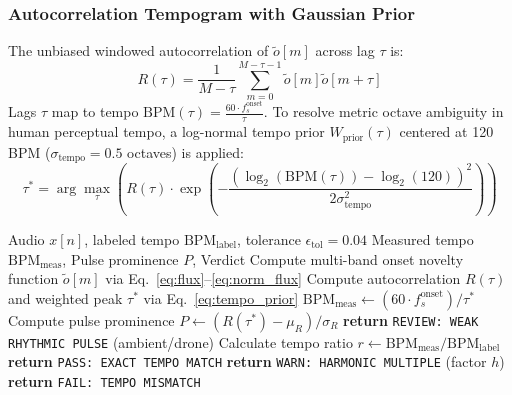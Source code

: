 \documentclass[10pt,journal,compsoc]{IEEEtran}
\begin{document}
\subsubsection{Autocorrelation Tempogram with Gaussian Prior}
The unbiased windowed autocorrelation of $\tilde{o}[m]$ across lag $\tau$ is:
\begin{equation}
R(\tau) = \frac{1}{M - \tau} \sum_{m=0}^{M - \tau - 1} \tilde{o}[m] \tilde{o}[m + \tau]
\label{eq:autocorr}
\end{equation}
Lags $\tau$ map to tempo $\text{BPM}(\tau) = \frac{60 \cdot f_s^{\text{onset}}}{\tau}$. To resolve metric octave ambiguity in human perceptual tempo, a log-normal tempo prior $W_{\text{prior}}(\tau)$ centered at 120\,BPM ($\sigma_{\text{tempo}} = 0.5$ octaves) is applied:
\begin{equation}
\tau^* = \arg\max_\tau \left( R(\tau) \cdot \exp\left( - \frac{(\log_2(\text{BPM}(\tau)) - \log_2(120))^2}{2 \sigma_{\text{tempo}}^2} \right) \right)
\label{eq:tempo_prior}
\end{equation}

\begin{algorithm}[t]
\caption{\texttt{tempocheck}: BPM Verification with Harmonic Tolerance}
\label{alg:tempocheck}
\begin{algorithmic}[1]
\REQUIRE Audio $x[n]$, labeled tempo $\text{BPM}_{\text{label}}$, tolerance $\epsilon_{\text{tol}} = 0.04$
\ENSURE Measured tempo $\text{BPM}_{\text{meas}}$, Pulse prominence $P$, Verdict
\STATE Compute multi-band onset novelty function $\tilde{o}[m]$ via Eq.~\eqref{eq:flux}--\eqref{eq:norm_flux}
\STATE Compute autocorrelation $R(\tau)$ and weighted peak $\tau^*$ via Eq.~\eqref{eq:tempo_prior}
\STATE $\text{BPM}_{\text{meas}} \leftarrow (60 \cdot f_s^{\text{onset}}) / \tau^*$
\STATE Compute pulse prominence $P \leftarrow (R(\tau^*) - \mu_R) / \sigma_R$
    \STATE \textbf{return} \texttt{REVIEW: WEAK RHYTHMIC PULSE} (ambient/drone)
\ENDIF
\STATE Calculate tempo ratio $r \leftarrow \text{BPM}_{\text{meas}} / \text{BPM}_{\text{label}}$
    \STATE \textbf{return} \texttt{PASS: EXACT TEMPO MATCH}
    \STATE \textbf{return} \texttt{WARN: HARMONIC MULTIPLE} (factor $h$)
\ELSE
    \STATE \textbf{return} \texttt{FAIL: TEMPO MISMATCH}
\ENDIF
\end{algorithmic}
\end{algorithm}
\end{document}
